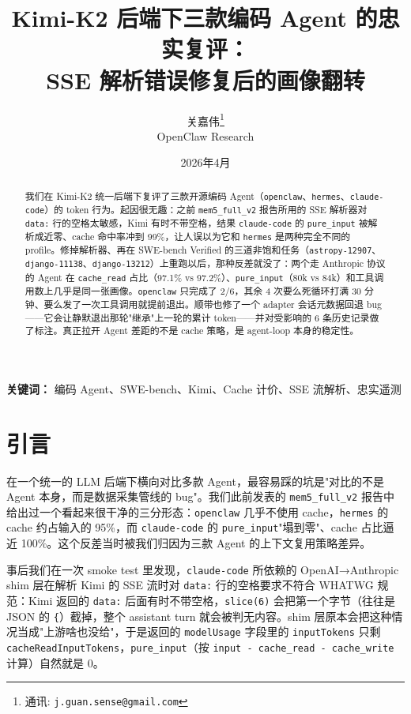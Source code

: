 \documentclass[11pt,a4paper]{article}
\title{\textbf{Kimi-K2 后端下三款编码 Agent 的忠实复评：\\SSE 解析错误修复后的画像翻转}}
\author{
  关嘉伟\thanks{通讯: \texttt{j.guan.sense@gmail.com}} \\
  OpenClaw Research \\
}
\date{2026年4月}
\begin{document}
\maketitle

\begin{abstract}
我们在 Kimi-K2 统一后端下复评了三款开源编码 Agent（\texttt{openclaw}、\texttt{hermes}、\texttt{claude-code}）的 token 行为。起因很无趣：之前 \texttt{mem5\_full\_v2} 报告所用的 SSE 解析器对 \texttt{data:} 行的空格太敏感，Kimi 有时不带空格，结果 \texttt{claude-code} 的 \texttt{pure\_input} 被解析成近零、cache 命中率冲到 99\%，让人误以为它和 \texttt{hermes} 是两种完全不同的 profile。修掉解析器、再在 SWE-bench Verified 的三道非饱和任务（\texttt{astropy-12907}、\texttt{django-11138}、\texttt{django-13212}）上重跑以后，那种反差就没了：两个走 Anthropic 协议的 Agent 在 \texttt{cache\_read} 占比（97.1\% vs 97.2\%）、\texttt{pure\_input}（80k vs 84k）和工具调用数上几乎是同一张画像。\texttt{openclaw} 只完成了 2/6，其余 4 次要么死循环打满 30 分钟、要么发了一次工具调用就提前退出。顺带也修了一个 adapter 会话元数据回退 bug——它会让静默退出那轮"继承"上一轮的累计 token——并对受影响的 6 条历史记录做了标注。真正拉开 Agent 差距的不是 cache 策略，是 agent-loop 本身的稳定性。
\end{abstract}

\vspace{0.5em}
\textbf{关键词：} 编码 Agent、SWE-bench、Kimi、Cache 计价、SSE 流解析、忠实遥测

\section{引言}
\label{sec:intro}

在一个统一的 LLM 后端下横向对比多款 Agent，最容易踩的坑是"对比的不是 Agent 本身，而是数据采集管线的 bug"。我们此前发表的 \texttt{mem5\_full\_v2} 报告中给出过一个看起来很干净的三分形态：\texttt{openclaw} 几乎不使用 cache，\texttt{hermes} 的 cache 约占输入的 95\%，而 \texttt{claude-code} 的 \texttt{pure\_input}"塌到零"、cache 占比逼近 100\%。这个反差当时被我们归因为三款 Agent 的上下文复用策略差异。

事后我们在一次 smoke test 里发现，\texttt{claude-code} 所依赖的 OpenAI→Anthropic shim 层在解析 Kimi 的 SSE 流时对 \texttt{data:} 行的空格要求不符合 WHATWG 规范：Kimi 返回的 \texttt{data:} 后面有时不带空格，\texttt{slice(6)} 会把第一个字节（往往是 JSON 的 \texttt{\{}）截掉，整个 assistant turn 就会被判无内容。shim 层原本会把这种情况当成"上游啥也没给"，于是返回的 \texttt{modelUsage} 字段里的 \texttt{inputTokens} 只剩 \texttt{cacheReadInputTokens}，\texttt{pure\_input}（按 \texttt{input - cache\_read - cache\_write} 计算）自然就是 0。
\end{document}
